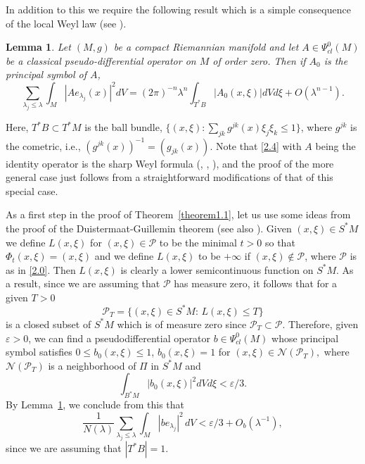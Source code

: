 \documentclass[10pt]{amsart}
\newtheorem{lemma}[theorem]{Lemma}
\begin{document}
In addition to this we require the following result which is a simple consequence
of the local Weyl law (see \cite{HoIV}).

\begin{lemma}\label{lemma1.1}
Let $(M,g)$ be a compact Riemannian manifold and let $A\in \Psi_{cl}^0(M)$ be
a classical pseudo-differential operator on $M$ of order zero.  Then
if $A_0$ is the principal symbol of $A$,
\begin{equation}\label{2.4}
\sum_{\lambda_j\le \lambda}\int_M |Ae_{\lambda_j}(x)|^2 dV
=(2\pi)^{-n}\lambda^n \int_{T^*B}|A_0(x,\xi)|dV d\xi
+O(\lambda^{n-1}).
\end{equation}
\end{lemma}

Here, $T^*B\subset T^*M$ is the ball bundle,  $\{(x,\xi): \sum_{jk}g^{jk}(x)\xi_j\xi_k\le 1\}$,
where $g^{jk}$ is the cometric, i.e., $(g^{jk}(x))^{-1}=(g_{jk}(x))$.  Note that \eqref{2.4} with
$A$ being the identity operator is the sharp Weyl formula (\cite{Av}, \cite{Le}, \cite{Ho1}), and the proof of the more general
case just follows from a straightforward modifications of that of this special case.

As a first step in the proof of Theorem~\ref{theorem1.1}, let us use some ideas from the proof of
the Duistermaat-Guillemin theorem \cite{dg} (see also \cite{ivrii}).  Given $(x,\xi)\in S^*M$
we define $L(x,\xi)$ for $(x,\xi)\in {\mathcal P}$ to be the minimal $t>0$ so that
$\Phi_t(x,\xi)=(x,\xi)$ and we define $L(x,\xi)$ to be $+\infty$ if $(x,\xi)\notin {\mathcal P}$,
where ${\mathcal P}$ is as in \eqref{2.0}.  Then $L(x,\xi)$ is clearly a lower semicontinuous
function on $S^*M$.    As a result, since we are assuming that ${\mathcal P}$ has measure
zero, it follows that for a given $T>0$
$${\mathcal P}_T=\{(x,\xi)\in S^*M: \, L(x,\xi)\le T\}$$
is a closed subset of $S^*M$ which is of measure zero since ${\mathcal P}_T\subset
{\mathcal P}$.  Therefore, given $\varepsilon>0$, we can find a
pseudodifferential operator $b\in \Psi^0_{cl}(M)$ whose
principal symbol satisfies $0\le b_0(x,\xi)\le1$, $b_0(x,\xi)=1$ for $(x,\xi)\in
{\mathcal N}({\mathcal P}_T),$ where ${\mathcal N}({\mathcal P}_T)$ is a neighborhood
of ${\varPi}$ in $S^*M$ and
$$\int_{B^*M}|b_0(x,\xi)|^2 dVd\xi <\varepsilon/3.$$
By Lemma~\ref{lemma1.1}, we conclude from this that
\begin{equation}\label{2.5}
\frac1{N(\lambda)}\sum_{\lambda_j\le \lambda}\int_M |be_{\lambda_j}|^2 \,
dV<\varepsilon/3+O_b(\lambda^{-1}),
\end{equation}
since we are assuming that $|T^*B|=1$.
\end{document}
